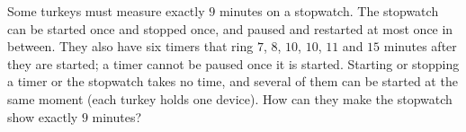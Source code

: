Some turkeys must measure exactly $9$ minutes on a stopwatch. The stopwatch can be started once and stopped once, and paused and restarted at most once in between. They also have six timers that ring $7$, $8$, $10$, $10$, $11$ and $15$ minutes after they are started; a timer cannot be paused once it is started. Starting or stopping a timer or the stopwatch takes no time, and several of them can be started at the same moment (each turkey holds one device). How can they make the stopwatch show exactly $9$ minutes?
